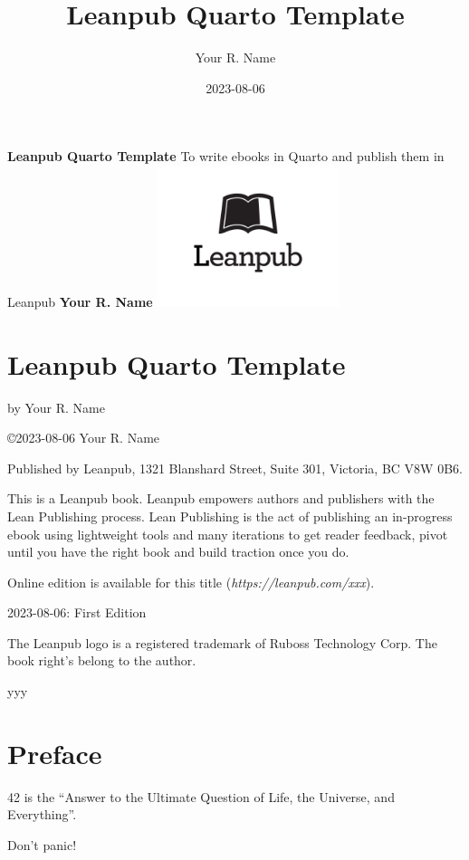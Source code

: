 \documentclass[letterpaper, 11pt, oneside]{scrbook}
\author{Your R. Name}
\title{Leanpub Quarto Template}
\date{2023-08-06}
\renewcommand{\maketitle}{%
  \begin{titlepage}
    \begin{center}
      \vfill
      \Huge
      \textbf{Leanpub Quarto Template}
      \vfill
      \LARGE
      To write ebooks in Quarto and publish them in Leanpub
      \vfill
      \textbf{Your R. Name}
      \vfill
      \includegraphics[width=0.4\textwidth]{figures/leanpub.pdf}
      \vfill
    \end{center}
  \end{titlepage}
}
\begin{document}
  \begin{center}\end{center} %
  \cleardoublepage
  \newpage

  \maketitle

  \chapter*{Leanpub Quarto Template}

  by Your R. Name

  \copyright 2023-08-06 Your R. Name

  Published by Leanpub, 1321 Blanshard Street, Suite 301, Victoria, BC V8W 0B6.
  
  This is a Leanpub book. Leanpub empowers authors and publishers with the Lean
  Publishing process. Lean Publishing is the act of publishing an in-progress
  ebook using lightweight tools and many iterations to get reader feedback, pivot
  until you have the right book and build traction once you do.

  Online edition is available for this title
  (\emph{https://leanpub.com/xxx}).

  2023-08-06: First Edition

  The Leanpub logo is a registered trademark of Ruboss Technology Corp. The
  book right's belong to the author.

  yyy

  \newpage

  \tableofcontents

  \mainmatter

  \frontmatter

  \hypertarget{preface}{%
  \chapter{Preface}\label{preface}}

  42 is the ``Answer to the Ultimate Question of Life, the Universe, and
  Everything''.

  \begin{center}
  Don't panic!
  \end{center}

  \mainmatter
\end{document}
